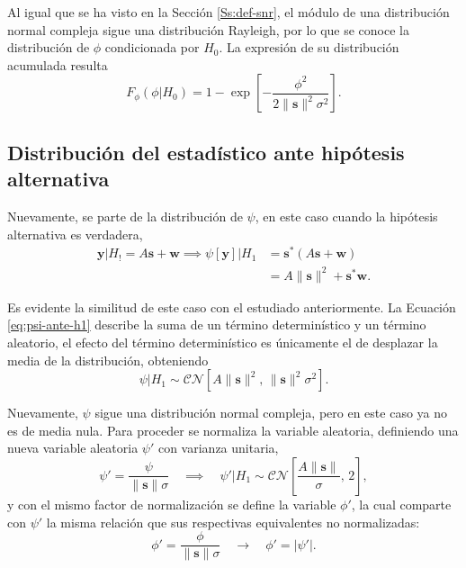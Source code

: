 Al igual que se ha visto en la Sección \ref{Ss:def-snr}, el módulo de una distribución normal compleja sigue una distribución Rayleigh, por lo que se conoce la distribución de $\phi$ condicionada por $H_0$. La expresión de su distribución acumulada resulta
\begin{equation}\label{eq:phi-ante-h0}
    F_\phi(\phi|H_0) = 1- \exp\left[-\frac{\phi^2}{2\lVert\mathbf{s}\rVert^2 \sigma^2}\right].
\end{equation}

\subsection{Distribución del estadístico ante hipótesis alternativa}

Nuevamente, se parte de la distribución de $\psi$, en este caso cuando la hipótesis alternativa es verdadera,
\begin{equation}\label{eq:psi-ante-h1}
    \begin{aligned} 
        \mathbf{y} | H_! = A\mathbf{s} + \mathbf{w} \implies \psi[\mathbf{y}] | H_1  
        &= \mathbf{s}^\ast\left(A\mathbf{s}+\mathbf{w}\right)\\ 
        &= A\lVert\mathbf{s}\rVert^2+\mathbf{s}^\ast\mathbf{w}.
    \end{aligned}
\end{equation}

Es evidente la similitud de este caso con el estudiado anteriormente. La Ecuación \ref{eq:psi-ante-h1} describe la suma de un término determinístico y un término aleatorio, el efecto del término determinístico es únicamente el de desplazar la media de la distribución, obteniendo
\begin{equation}
    \psi | H_1 \sim \mathcal{CN}\left[A\lVert\mathbf{s}\rVert^2,\,\lVert \mathbf{s}\rVert^2  \sigma^2 \right].
\end{equation}

Nuevamente, $\psi$ sigue una distribución normal compleja, pero en este caso ya no es de media nula. Para proceder se normaliza la variable aleatoria, definiendo una nueva variable aleatoria $\psi'$ con varianza unitaria,
\begin{equation}
    \psi' = \frac{\psi}{\lVert \mathbf{s} \rVert \sigma} \quad \implies \quad     \psi' | H_1 \sim \mathcal{CN}\left[\frac{A\lVert\mathbf{s}\rVert}{\sigma},\, 2 \right],
\end{equation}
y con el mismo factor de normalización se define la variable $\phi'$, la cual comparte con $\psi'$ la misma relación que sus respectivas equivalentes no normalizadas:
\begin{equation}
\phi' = \frac{\phi}{\lVert \mathbf{s} \rVert \sigma} \quad \longrightarrow \quad     \phi' = \lvert\psi'\rvert.
\end{equation}

